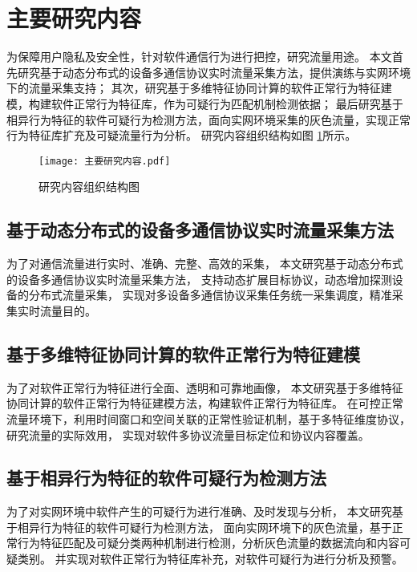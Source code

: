 \section{主要研究内容}

为保障用户隐私及安全性，针对软件通信行为进行把控，研究流量用途。
本文首先研究基于动态分布式的设备多通信协议实时流量采集方法，提供演练与实网环境下的流量采集支持；
其次，研究基于多维特征协同计算的软件正常行为特征建模，构建软件正常行为特征库，作为可疑行为匹配机制检测依据；
最后研究基于相异行为特征的软件可疑行为检测方法，面向实网环境采集的灰色流量，实现正常行为特征库扩充及可疑流量行为分析。
研究内容组织结构如图 \ref{fig:研究内容组织结构图}所示。


 
\FloatBarrier

\begin{figure}[ht]
  \centering
  \texttt{[image: 主要研究内容.pdf]}
  \caption{研究内容组织结构图}
  \label{fig:研究内容组织结构图}
\end{figure} 

\FloatBarrier
 
\subsection{基于动态分布式的设备多通信协议实时流量采集方法}

为了对通信流量进行实时、准确、完整、高效的采集，
本文研究基于动态分布式的设备多通信协议实时流量采集方法，
支持动态扩展目标协议，动态增加探测设备的分布式流量采集，
实现对多设备多通信协议采集任务统一采集调度，精准采集实时流量目的。

\subsection{基于多维特征协同计算的软件正常行为特征建模}

为了对软件正常行为特征进行全面、透明和可靠地画像，
本文研究基于多维特征协同计算的软件正常行为特征建模方法，构建软件正常行为特征库。
在可控正常流量环境下，利用时间窗口和空间关联的正常性验证机制，基于多特征维度协议，研究流量的实际效用，
实现对软件多协议流量目标定位和协议内容覆盖。

\subsection{基于相异行为特征的软件可疑行为检测方法}

为了对实网环境中软件产生的可疑行为进行准确、及时发现与分析，
本文研究基于相异行为特征的软件可疑行为检测方法，
面向实网环境下的灰色流量，基于正常行为特征匹配及可疑分类两种机制进行检测，分析灰色流量的数据流向和内容可疑类别。
并实现对软件正常行为特征库补充，对软件可疑行为进行分析及预警。
 
